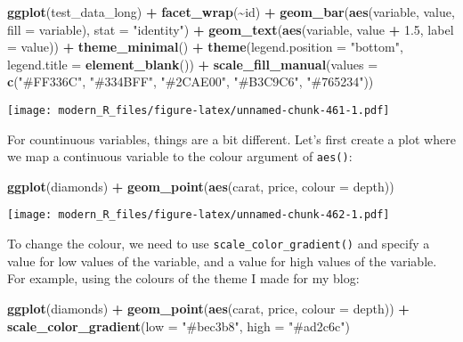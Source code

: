 \documentclass[
]{article}
\newenvironment{Shaded}{\begin{snugshade}}{\end{snugshade}}
\newcommand{\DataTypeTok}[1]{\textcolor[rgb]{0.13,0.29,0.53}{#1}}
\newcommand{\FloatTok}[1]{\textcolor[rgb]{0.00,0.00,0.81}{#1}}
\newcommand{\KeywordTok}[1]{\textcolor[rgb]{0.13,0.29,0.53}{\textbf{#1}}}
\newcommand{\NormalTok}[1]{#1}
\newcommand{\OperatorTok}[1]{\textcolor[rgb]{0.81,0.36,0.00}{\textbf{#1}}}
\newcommand{\StringTok}[1]{\textcolor[rgb]{0.31,0.60,0.02}{#1}}
\begin{document}
\begin{Shaded}
\begin{Highlighting}[]
\KeywordTok{ggplot}\NormalTok{(test\_data\_long) }\OperatorTok{+}
\StringTok{  }\KeywordTok{facet\_wrap}\NormalTok{(}\OperatorTok{\textasciitilde{}}\NormalTok{id) }\OperatorTok{+}
\StringTok{  }\KeywordTok{geom\_bar}\NormalTok{(}\KeywordTok{aes}\NormalTok{(variable, value, }\DataTypeTok{fill =}\NormalTok{ variable), }\DataTypeTok{stat =} \StringTok{"identity"}\NormalTok{) }\OperatorTok{+}
\StringTok{  }\KeywordTok{geom\_text}\NormalTok{(}\KeywordTok{aes}\NormalTok{(variable, value }\OperatorTok{+}\StringTok{ }\FloatTok{1.5}\NormalTok{, }\DataTypeTok{label =}\NormalTok{ value)) }\OperatorTok{+}
\StringTok{  }\KeywordTok{theme\_minimal}\NormalTok{() }\OperatorTok{+}
\StringTok{  }\KeywordTok{theme}\NormalTok{(}\DataTypeTok{legend.position =} \StringTok{"bottom"}\NormalTok{, }\DataTypeTok{legend.title =} \KeywordTok{element\_blank}\NormalTok{()) }\OperatorTok{+}
\StringTok{  }\KeywordTok{scale\_fill\_manual}\NormalTok{(}\DataTypeTok{values =} \KeywordTok{c}\NormalTok{(}\StringTok{"\#FF336C"}\NormalTok{, }\StringTok{"\#334BFF"}\NormalTok{, }\StringTok{"\#2CAE00"}\NormalTok{, }\StringTok{"\#B3C9C6"}\NormalTok{, }\StringTok{"\#765234"}\NormalTok{))}
\end{Highlighting}
\end{Shaded}

\texttt{[image: modern\_R\_files/figure-latex/unnamed-chunk-461-1.pdf]}

For countinuous variables, things are a bit different. Let's first create a plot where we map a continuous
variable to the colour argument of \texttt{aes()}:

\begin{Shaded}
\begin{Highlighting}[]
\KeywordTok{ggplot}\NormalTok{(diamonds) }\OperatorTok{+}
\StringTok{  }\KeywordTok{geom\_point}\NormalTok{(}\KeywordTok{aes}\NormalTok{(carat, price, }\DataTypeTok{colour =}\NormalTok{ depth))}
\end{Highlighting}
\end{Shaded}

\texttt{[image: modern\_R\_files/figure-latex/unnamed-chunk-462-1.pdf]}

To change the colour, we need to use \texttt{scale\_color\_gradient()} and specify a value for low values of the variable,
and a value for high values of the variable. For example, using the colours of the theme I made for my blog:

\begin{Shaded}
\begin{Highlighting}[]
\KeywordTok{ggplot}\NormalTok{(diamonds) }\OperatorTok{+}
\StringTok{  }\KeywordTok{geom\_point}\NormalTok{(}\KeywordTok{aes}\NormalTok{(carat, price, }\DataTypeTok{colour =}\NormalTok{ depth)) }\OperatorTok{+}
\StringTok{  }\KeywordTok{scale\_color\_gradient}\NormalTok{(}\DataTypeTok{low =} \StringTok{"\#bec3b8"}\NormalTok{, }\DataTypeTok{high =} \StringTok{"\#ad2c6c"}\NormalTok{)}
\end{Highlighting}
\end{Shaded}
\end{document}
